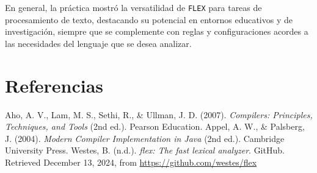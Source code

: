 \documentclass{article}
\begin{document}
En general, la práctica mostró la versatilidad de \texttt{FLEX} para tareas de procesamiento de texto, destacando su potencial en entornos educativos y de investigación, siempre que se complemente con reglas y configuraciones acordes a las necesidades del lenguaje que se desea analizar.

\section{Referencias}
\renewcommand{\refname}{}

\begin{thebibliography}{9}
Aho, A. V., Lam, M. S., Sethi, R., \& Ullman, J. D. (2007). \textit{Compilers: Principles, Techniques, and Tools} (2nd ed.). Pearson Education.
Appel, A. W., \& Palsberg, J. (2004). \textit{Modern Compiler Implementation in Java} (2nd ed.). Cambridge University Press.
Westes, B. (n.d.). \textit{flex: The fast lexical analyzer}. GitHub. Retrieved December 13, 2024, from \url{https://github.com/westes/flex}

\end{thebibliography}
\end{document}
